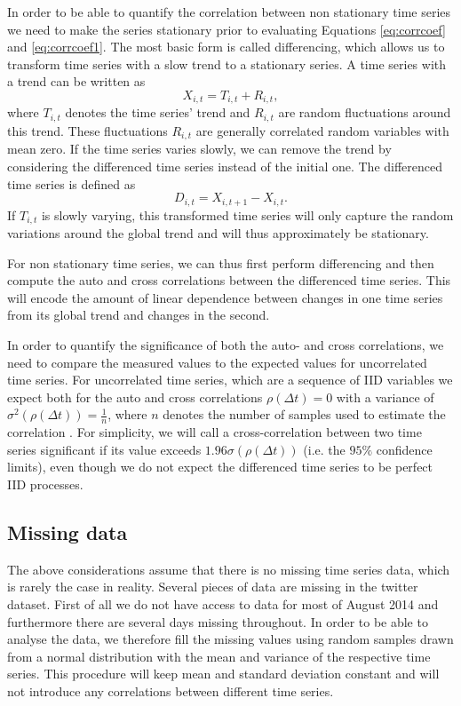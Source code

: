 \documentclass[12pt, a4paper]{article}
\begin{document}
In order to be able to quantify the correlation between non stationary time series we need to make the series stationary prior to evaluating Equations \ref{eq:corrcoef} and \ref{eq:corrcoef1}. The most basic form is called differencing, which allows us to transform time series with a slow trend to a stationary series. A time series with a trend can be written as \cite{dettling14}
\begin{equation}
X_{i, t} = T_{i, t} + R_{i, t},
\end{equation} 
where $T_{i, t}$ denotes the time series' trend and $R_{i, t}$ are random fluctuations around this trend. These fluctuations $R_{i, t}$ are generally correlated random variables with mean zero. If the time series varies slowly, we can remove the trend by considering the differenced time series instead of the initial one. The differenced time series is defined as \cite{dettling14}
\begin{equation}
D_{i, t} = X_{i, t+1}- X_{i, t}.
\label{eq:diff}
\end{equation} 
If $T_{i, t}$ is slowly varying, this transformed time series will only capture the random variations around the global trend and will thus approximately be stationary.

For non stationary time series, we can thus first perform differencing and then compute the auto and cross correlations between the differenced time series. This will encode the amount of linear dependence between changes in one time series from its global trend and changes in the second. 

In order to quantify the significance of both the auto- and cross correlations, we need to compare the measured values to the expected values for uncorrelated time series. For uncorrelated time series, which are a sequence of IID variables we expect both for the auto and cross correlations $\rho(\Delta t) = 0$ with a variance of $\sigma^{2}(\rho(\Delta t)) = \frac{1}{n}$, where $n$ denotes the number of samples used to estimate the correlation \cite{dettling14}. For simplicity, we will call a cross-correlation between two time series significant if its value exceeds $1.96 \sigma(\rho(\Delta t))$ (i.e. the $95 \%$ confidence limits), even though we do not expect the differenced time series to be perfect IID processes. 

\subsection{Missing data}\label{sec:missingdata}
The above considerations assume that there is no missing time series data, which is rarely the case in reality. Several pieces of data are missing in the twitter dataset. First of all we do not have access to data for most of August 2014 and furthermore there are several days missing throughout. In order to be able to analyse the data, we therefore fill the missing values using random samples drawn from a normal distribution with the mean and variance of the respective time series. This procedure will keep mean and standard deviation constant and will not introduce any correlations between different time series.
\end{document}

